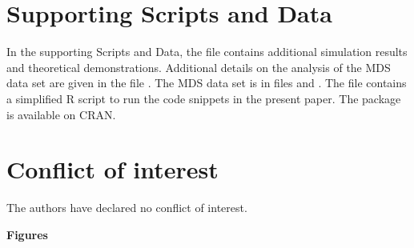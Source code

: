 \section*{Supporting Scripts and Data}
In the supporting Scripts and Data, the file  contains additional simulation results and theoretical demonstrations.   Additional details on the analysis of the MDS data set are given in the file . The MDS data set is in files  and . The file  contains a simplified R script to run the code snippets in the present paper. The  package is available on CRAN.

\section{Conflict of interest}
The authors have declared no conflict of interest.




\address{Rui J.  Costa\\
  European Molecular Biology Laboratory\\	  
  European Bioinformatics Institute (EMBL-EBI)\\
  Hinxton, CB10 1SD\\
  United Kingdom\\
  }

\address{Moritz Gerstung\\
  aff. 1: European Molecular Biology Laboratory\\      European Bioinformatics Institute (EMBL-EBI)\\
  Hinxton, CB10 1SD\\
  United Kindom\\
  aff. 2: German Cancer Research Center (DKFZ)\\
  Im Neuenheimer Feld 280\\
  69120 Heidelberg\\
  Germany\\
  }

\clearpage
  
  {\LARGE \textbf{Figures}}
\vspace{3cm}


